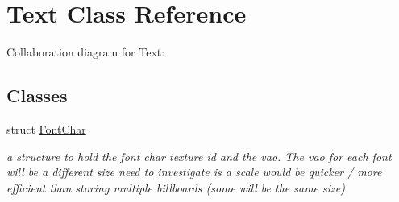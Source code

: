\hypertarget{class_text}{\section{Text Class Reference}
\label{class_text}
}


Collaboration diagram for Text\-:
\subsection*{Classes}
\begin{DoxyCompactItemize}
\item 
struct \hyperlink{struct_text_1_1_font_char}{Font\-Char}
\begin{DoxyCompactList}\small\item\em a structure to hold the font char texture id and the vao. The vao for each font will be a different size need to investigate is a scale would be quicker / more efficient than storing multiple billboards (some will be the same size) \end{DoxyCompactList}\end{DoxyCompactItemize}
